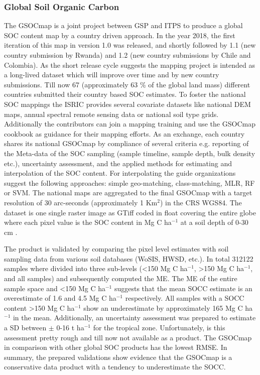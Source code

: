 		\subsubsection{Global Soil Organic Carbon}
			The \ac{GSOCmap} is a joint project between \ac{GSP} and \ac{ITPS} to produce a global \ac{SOC} content map by a country driven approach. In the year 2018, the first iteration of this map in version 1.0 was released, and shortly followed by 1.1 (new country submission by Rwanda) and 1.2 (new country submissions by Chile and Colombia). As the short release cycle suggests the mapping project is intended as a long-lived dataset which will improve over time and by new country submissions. Till now 67 (approximately 63 \% of the global land mass) different countries submitted their country based \ac{SOC} estimates. To foster the national \ac{SOC} mappings the \ac{ISRIC} provides several covariate datasets like national \ac{DEM} maps, annual spectral remote sensing data or national soil type grids. Additionally the contributors can join a mapping training and use the \ac{GSOCmap} cookbook as guidance for their mapping efforts. As an exchange, each country shares its national \ac{GSOCmap} by compliance of several criteria e.g. reporting of the Meta-data of the \ac{SOC} sampling (sample timeline, sample depth, bulk density etc.), uncertainty assessment, and the applied methods for estimating and interpolation of the \ac{SOC} content. For interpolating the guide organizations suggest the following approaches: simple geo-matching, class-matching, \ac{MLR}, \ac{RF} or \ac{SVM}. The national maps are aggregated to the final \ac{GSOCmap} with a target resolution of 30 arc-seconds (approximately 1 Km$^2$) in the \ac{CRS} \ac{WGS84}. The dataset is one single raster image as \ac{GTiff} coded in float covering the entire globe where each pixel value is the \ac{SOC} content in Mg C ha$^{-1}$ at a soil depth of 0-30 cm \citep{FAO2018}.

			The product is validated by comparing the pixel level estimates with soil sampling data from various soil databases (WoSIS, HWSD, etc.). In total 312122 samples where divided into three sub-levels (<150 Mg C ha$^{-1}$, >150 Mg C ha$^{-1}$, and all samples) and subsequently computed the \ac{ME}. The \ac{ME} of the entire sample space and <150 Mg C ha$^{-1}$ suggests that the mean \ac{SOCC} estimate is an overestimate of 1.6 and 4.5 Mg C ha$^{-1}$ respectively. All samples with a \ac{SOCC} content >150 Mg C ha$^{-1}$ show an underestimate by approximately 165 Mg C ha$^{-1}$ in the mean. Additionally, an uncertainty assessment was prepared to estimate a \ac{SD} between $\pm$ 0-16 t ha$^{-1}$ for the tropical zone. Unfortunately, is this assessment pretty rough and till now not available as a product. The \ac{GSOCmap} in comparison with other global \ac{SOC} products has the lowest \ac{RMSE}. In summary, the prepared validations show evidence that the \ac{GSOCmap} is a conservative data product with a tendency to underestimate the \ac{SOCC}.

